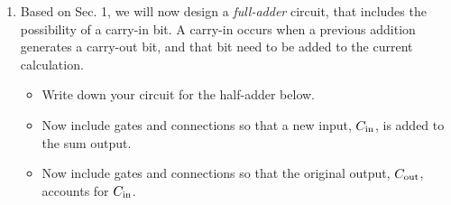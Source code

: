 \documentclass{article}
\begin{document}
\begin{enumerate}
\item Based on Sec. 1, we will now design a \textit{full-adder} circuit, that includes the possibility of a carry-in bit.  A carry-in occurs when a previous addition generates a carry-out bit, and that bit need to be added to the current calculation.
\begin{itemize}
\item Write down your circuit for the half-adder below. \\ \vspace{4cm}
\item Now include gates and connections so that a new input, $C_{\rm in}$, is added to the sum output. \\ \vspace{4cm}
\item Now include gates and connections so that the original output, $C_{\rm out}$, accounts for $C_{\rm in}$.
\end{itemize}
\end{enumerate}
\end{document}
